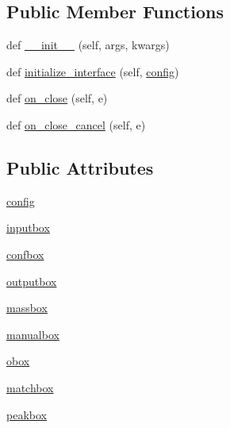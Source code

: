 \subsection*{Public Member Functions}
\begin{DoxyCompactItemize}
\item 
def \hyperlink{class_uni_dec_1_1unidec__modules_1_1miscwindows_1_1_file_name_dialog_ae755a1aff3d8f148e2b938c9fffd4e7c}{\+\_\+\+\_\+init\+\_\+\+\_\+} (self, args, kwargs)
\item 
def \hyperlink{class_uni_dec_1_1unidec__modules_1_1miscwindows_1_1_file_name_dialog_a93d47a511295b50d1594a5ac47f8d15e}{initialize\+\_\+interface} (self, \hyperlink{class_uni_dec_1_1unidec__modules_1_1miscwindows_1_1_file_name_dialog_ae1cdab9379fa0707781a5e08770f9758}{config})
\item 
def \hyperlink{class_uni_dec_1_1unidec__modules_1_1miscwindows_1_1_file_name_dialog_aaa6c4b302a79e190c4f73e73735c2382}{on\+\_\+close} (self, e)
\item 
def \hyperlink{class_uni_dec_1_1unidec__modules_1_1miscwindows_1_1_file_name_dialog_add074efa49b187e0f05850cb24c8b265}{on\+\_\+close\+\_\+cancel} (self, e)
\end{DoxyCompactItemize}
\subsection*{Public Attributes}
\begin{DoxyCompactItemize}
\item 
\hyperlink{class_uni_dec_1_1unidec__modules_1_1miscwindows_1_1_file_name_dialog_ae1cdab9379fa0707781a5e08770f9758}{config}
\item 
\hyperlink{class_uni_dec_1_1unidec__modules_1_1miscwindows_1_1_file_name_dialog_a729b5ff1c5eeb7728bf24472f0a4a250}{inputbox}
\item 
\hyperlink{class_uni_dec_1_1unidec__modules_1_1miscwindows_1_1_file_name_dialog_a0432ace388c5ce1275813d03dd61fca0}{confbox}
\item 
\hyperlink{class_uni_dec_1_1unidec__modules_1_1miscwindows_1_1_file_name_dialog_a2466a2a475542540cd0537465e2233e8}{outputbox}
\item 
\hyperlink{class_uni_dec_1_1unidec__modules_1_1miscwindows_1_1_file_name_dialog_a87100b0bfcd179e4d3536dbd1904eb02}{massbox}
\item 
\hyperlink{class_uni_dec_1_1unidec__modules_1_1miscwindows_1_1_file_name_dialog_af0d35a51edf5b5b8e6d4c3082c94bf67}{manualbox}
\item 
\hyperlink{class_uni_dec_1_1unidec__modules_1_1miscwindows_1_1_file_name_dialog_a6fff706be2d5583c3ae51e7dbb3c0c65}{obox}
\item 
\hyperlink{class_uni_dec_1_1unidec__modules_1_1miscwindows_1_1_file_name_dialog_a42a4844af280c8f534ee814f7fb997f5}{matchbox}
\item 
\hyperlink{class_uni_dec_1_1unidec__modules_1_1miscwindows_1_1_file_name_dialog_a3feaf8f79eaa40f20447662228238f9a}{peakbox}
\end{DoxyCompactItemize}


